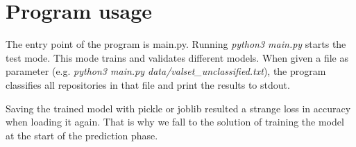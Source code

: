 \documentclass[a4paper]{scrartcl}
\begin{document}
\section{Program usage}
The entry point of the program is main.py. Running \textit{python3 main.py} starts the test mode. This mode trains and validates different models. When given a file as parameter (e.g. \textit{python3 main.py data/valset\_unclassified.txt}), the program classifies all repositories in that file and print the results to stdout.

Saving the trained model with pickle or joblib resulted a strange loss in accuracy when loading it again. That is why we fall to the solution of training the model at the start of the prediction phase.
\end{document}
